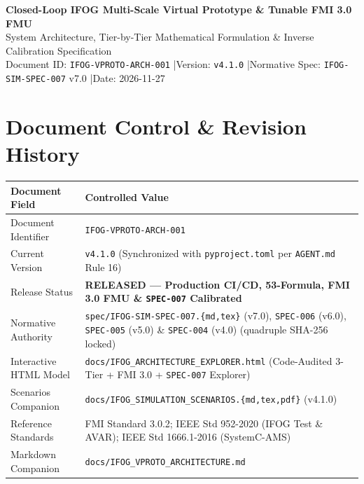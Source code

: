 \documentclass[11pt,a4paper]{article}
\newcommand{\DocID}{IFOG-VPROTO-ARCH-001}
\newcommand{\DocVersion}{v4.1.0}
\newcommand{\DocDate}{2026-11-27}
\begin{document}
\begin{tcolorbox}[colback=NavyBlue,colframe=NavyBlue,arc=4pt,boxrule=0pt,left=12pt,right=12pt,top=10pt,bottom=10pt]
{\color{white}\Large\bfseries Closed-Loop IFOG Multi-Scale Virtual Prototype \& Tunable FMI 3.0 FMU}\\[4pt]
{\color{white}\large System Architecture, Tier-by-Tier Mathematical Formulation \& Inverse Calibration Specification}\\[6pt]
{\color{white}\small Document ID: \texttt{\DocID} \quad|\quad Version: \texttt{\DocVersion} \quad|\quad Normative Spec: \texttt{IFOG-SIM-SPEC-007} v7.0 \quad|\quad Date: \DocDate}
\end{tcolorbox}

\section{Document Control \& Revision History}

\small
\begin{tabularx}{\textwidth}{@{}p{3.6cm} X@{}}
\toprule
\textbf{Document Field} & \textbf{Controlled Value} \\
\midrule
Document Identifier & \texttt{\DocID} \\
Current Version & \texttt{\DocVersion} (Synchronized with \texttt{pyproject.toml} per \texttt{AGENT.md} Rule 16) \\
Release Status & \textcolor{TealDark}{\textbf{RELEASED --- Production CI/CD, 53-Formula, FMI 3.0 FMU \& \texttt{SPEC-007} Calibrated}} \\
Normative Authority & \texttt{spec/IFOG-SIM-SPEC-007.\{md,tex\}} (v7.0), \texttt{SPEC-006} (v6.0), \texttt{SPEC-005} (v5.0) \& \texttt{SPEC-004} (v4.0) (quadruple SHA-256 locked) \\
Interactive HTML Model & \texttt{docs/IFOG\_ARCHITECTURE\_EXPLORER.html} (Code-Audited 3-Tier + FMI 3.0 + \texttt{SPEC-007} Explorer) \\
Scenarios Companion & \texttt{docs/IFOG\_SIMULATION\_SCENARIOS.\{md,tex,pdf\}} (\DocVersion) \\
Reference Standards & FMI Standard 3.0.2; IEEE Std 952-2020 (IFOG Test \& AVAR); IEEE Std 1666.1-2016 (SystemC-AMS) \\
Markdown Companion & \texttt{docs/IFOG\_VPROTO\_ARCHITECTURE.md} \\
\bottomrule
\end{tabularx}
\end{document}
